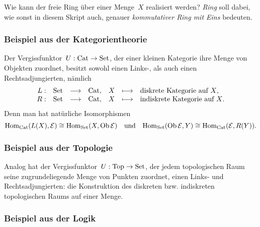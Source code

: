 \begin{aufg}Wie kann der freie Ring über einer Menge~$X$ realisiert werden?
\emph{Ring} soll dabei, wie sonst in diesem Skript auch, genauer
\emph{kommutativer Ring mit Eins} bedeuten.\end{aufg}


\subsubsection*{Beispiel aus der Kategorientheorie}

Der Vergissfunktor~$U : \mathrm{Cat} \to \mathrm{Set}$, der einer kleinen Kategorie
ihre Menge von Objekten zuordnet, besitzt sowohl einen Links-, als auch einen
Rechtsadjungierten, nämlich
\[ \begin{array}{@{}rrclrcl@{}}
  L : & \Set &\longrightarrow& \Cat, & X &\longmapsto& \text{diskrete Kategorie auf~$X$,} \\
  R : & \Set &\longrightarrow& \Cat, & X &\longmapsto& \text{indiskrete Kategorie auf~$X$.}
\end{array} \]
Denn man hat natürliche Isomorphismen
\[ \mathrm{Hom}_{\mathrm{Cat}}(L(X), \mathcal{E}) \cong \mathrm{Hom}_{\mathrm{Set}}(X, \operatorname{Ob}\mathcal{E})
  \quad\text{und}\quad
  \mathrm{Hom}_{\mathrm{Set}}(\operatorname{Ob}\mathcal{E}, Y) \cong \mathrm{Hom}_{\mathrm{Cat}}(\mathcal{E}, R(Y)). \]



\subsubsection*{Beispiel aus der Topologie}

Analog hat der Vergissfunktor~$U : \mathrm{Top} \to \mathrm{Set}$, der jedem
topologischen Raum seine zugrundeliegende Menge von Punkten zuordnet, einen
Links- und Rechtsadjungierten: die Konstruktion des diskreten bzw. indiskreten
topologischen Raums auf einer Menge.


\subsubsection*{Beispiel aus der Logik}

